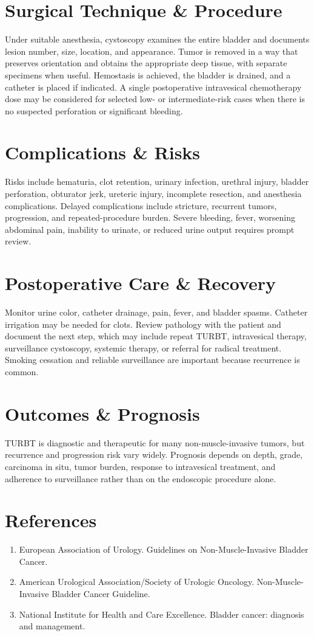 \section*{Surgical Technique \& Procedure}
Under suitable anesthesia, cystoscopy examines the entire bladder and documents lesion number, size, location, and appearance. Tumor is removed in a way that preserves orientation and obtains the appropriate deep tissue, with separate specimens when useful. Hemostasis is achieved, the bladder is drained, and a catheter is placed if indicated. A single postoperative intravesical chemotherapy dose may be considered for selected low- or intermediate-risk cases when there is no suspected perforation or significant bleeding.

\section*{Complications \& Risks}
Risks include hematuria, clot retention, urinary infection, urethral injury, bladder perforation, obturator jerk, ureteric injury, incomplete resection, and anesthesia complications. Delayed complications include stricture, recurrent tumors, progression, and repeated-procedure burden. Severe bleeding, fever, worsening abdominal pain, inability to urinate, or reduced urine output requires prompt review.

\section*{Postoperative Care \& Recovery}
Monitor urine color, catheter drainage, pain, fever, and bladder spasms. Catheter irrigation may be needed for clots. Review pathology with the patient and document the next step, which may include repeat TURBT, intravesical therapy, surveillance cystoscopy, systemic therapy, or referral for radical treatment. Smoking cessation and reliable surveillance are important because recurrence is common.

\section*{Outcomes \& Prognosis}
TURBT is diagnostic and therapeutic for many non-muscle-invasive tumors, but recurrence and progression risk vary widely. Prognosis depends on depth, grade, carcinoma in situ, tumor burden, response to intravesical treatment, and adherence to surveillance rather than on the endoscopic procedure alone.

\section*{References}
\begin{enumerate}
\item European Association of Urology. Guidelines on Non-Muscle-Invasive Bladder Cancer.
\item American Urological Association/Society of Urologic Oncology. Non-Muscle-Invasive Bladder Cancer Guideline.
\item National Institute for Health and Care Excellence. Bladder cancer: diagnosis and management.
\end{enumerate}
